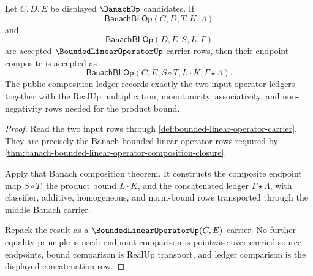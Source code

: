 \begin{theorem}
\label{thm:bounded-linear-operator-composition-closure}
Let $C,D,E$ be displayed $\BanachUp$ candidates. If
$$
\mathsf{BanachBLOp}(C,D,T,K,\Lambda)
$$
and
$$
\mathsf{BanachBLOp}(D,E,S,L,\Gamma)
$$
are accepted $\BoundedLinearOperatorUp$ carrier rows, then their endpoint composite is accepted as
$$
\mathsf{BanachBLOp}(C,E,S\circ T,L\cdot K,\Gamma\star\Lambda).
$$
The public composition ledger records exactly the two input operator ledgers together with the RealUp multiplication, monotonicity, associativity, and non-negativity rows needed for the product bound.
\end{theorem}
\begin{proof}
Read the two input rows through \autoref{def:bounded-linear-operator-carrier}. They are precisely the Banach bounded-linear-operator rows required by \autoref{thm:banach-bounded-linear-operator-composition-closure}.

Apply that Banach composition theorem. It constructs the composite endpoint map $S\circ T$, the product bound $L\cdot K$, and the concatenated ledger $\Gamma\star\Lambda$, with classifier, additive, homogeneous, and norm-bound rows transported through the middle Banach carrier.

Repack the result as a $\BoundedLinearOperatorUp(C,E)$ carrier. No further equality principle is used: endpoint comparison is pointwise over carried source endpoints, bound comparison is RealUp transport, and ledger comparison is the displayed concatenation row.
\end{proof}

